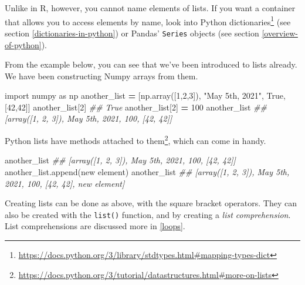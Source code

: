 \documentclass[
  12pt,
  krantz2]{krantz}
\makeatletter
\newenvironment{Shaded}{\begin{snugshade}}{\end{snugshade}}
\newcommand{\CommentTok}[1]{\textcolor[rgb]{0.37,0.37,0.37}{\textit{#1}}}
\newcommand{\DecValTok}[1]{\textcolor[rgb]{0.06,0.06,0.06}{#1}}
\newcommand{\ImportTok}[1]{#1}
\newcommand{\NormalTok}[1]{#1}
\newcommand{\OperatorTok}[1]{\textcolor[rgb]{0.43,0.43,0.43}{\textbf{#1}}}
\newcommand{\StringTok}[1]{\textcolor[rgb]{0.5,0.5,0.5}{#1}}
\newcommand{\VariableTok}[1]{\textcolor[rgb]{0,0,0}{#1}}
\renewcommand{\href}[2]{#2\footnote{\url{#1}}}
\newenvironment{kframe}{%
\medskip{}
\setlength{\fboxsep}{.8em}
 \def\at@end@of@kframe{}%
 \ifinner\ifhmode%
  \def\at@end@of@kframe{\end{minipage}}%
  \begin{minipage}{\columnwidth}%
 \fi\fi%
 \def\FrameCommand##1{\hskip\@totalleftmargin \hskip-\fboxsep
 \colorbox{shadecolor}{##1}\hskip-\fboxsep
     \hskip-\linewidth \hskip-\@totalleftmargin \hskip\columnwidth}%
 \MakeFramed {\advance\hsize-\width
   \@totalleftmargin\z@ \linewidth\hsize
   \@setminipage}}%
 {\par\unskip\endMakeFramed%
 \at@end@of@kframe}
\renewenvironment{Shaded}{\begin{kframe}}{\end{kframe}}
\makeatother
\begin{document}
Unlike in R, however, you cannot name elements of lists. If you want a container that allows you to access elements by name, look into Python \href{https://docs.python.org/3/library/stdtypes.html\#mapping-types-dict}{dictionaries} (see section \ref{dictionaries-in-python}) or Pandas' \texttt{Series} objects (see section \ref{overview-of-python}).

From the example below, you can see that we've been introduced to lists already. We have been constructing Numpy arrays from them.

\begin{Shaded}
\begin{Highlighting}[]
\ImportTok{import}\NormalTok{ numpy }\ImportTok{as}\NormalTok{ np}
\NormalTok{another\_list }\OperatorTok{=}\NormalTok{ [np.array([}\DecValTok{1}\NormalTok{,}\DecValTok{2}\NormalTok{,}\DecValTok{3}\NormalTok{]), }\StringTok{"May 5th, 2021"}\NormalTok{, }\VariableTok{True}\NormalTok{, [}\DecValTok{42}\NormalTok{,}\DecValTok{42}\NormalTok{]]}
\NormalTok{another\_list[}\DecValTok{2}\NormalTok{]}
\CommentTok{\#\# True}
\NormalTok{another\_list[}\DecValTok{2}\NormalTok{] }\OperatorTok{=} \DecValTok{100}
\NormalTok{another\_list}
\CommentTok{\#\# [array([1, 2, 3]), \textquotesingle{}May 5th, 2021\textquotesingle{}, 100, [42, 42]]}
\end{Highlighting}
\end{Shaded}

Python lists have \href{https://docs.python.org/3/tutorial/datastructures.html\#more-on-lists}{methods attached to them}, which can come in handy.

\begin{Shaded}
\begin{Highlighting}[]
\NormalTok{another\_list}
\CommentTok{\#\# [array([1, 2, 3]), \textquotesingle{}May 5th, 2021\textquotesingle{}, 100, [42, 42]]}
\NormalTok{another\_list.append(}\StringTok{\textquotesingle{}new element\textquotesingle{}}\NormalTok{)}
\NormalTok{another\_list}
\CommentTok{\#\# [array([1, 2, 3]), \textquotesingle{}May 5th, 2021\textquotesingle{}, 100, [42, 42], \textquotesingle{}new element\textquotesingle{}]}
\end{Highlighting}
\end{Shaded}

Creating lists can be done as above, with the square bracket operators. They can also be created with the \texttt{list()} function, and by creating a \emph{list comprehension}. List comprehensions are discussed more in \ref{loops}.
\end{document}

